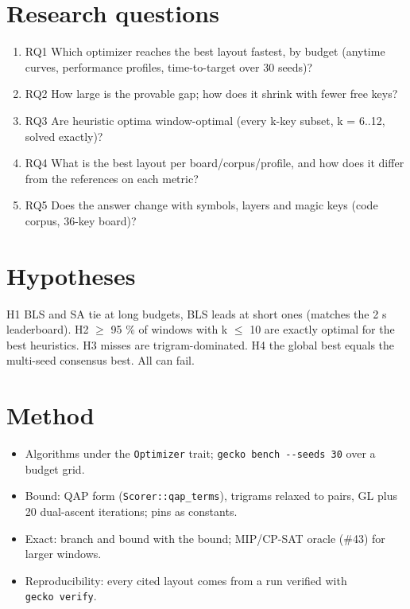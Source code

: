 \documentclass{gecko-paper}
\begin{document}
\begin{paperbody}
\section{Research questions}

\begin{enumerate}
\def\labelenumi{\arabic{enumi}.}
\setlength{\itemsep}{1pt}\setlength{\parskip}{0pt}
\item
  RQ1 Which optimizer reaches the best layout fastest, by budget
  (anytime curves, performance profiles, time-to-target over 30 seeds)?
\item
  RQ2 How large is the provable gap; how does it shrink with fewer free
  keys?
\item
  RQ3 Are heuristic optima window-optimal (every k-key subset, k =
  6..12, solved exactly)?
\item
  RQ4 What is the best layout per board/corpus/profile, and how does it
  differ from the references on each metric?
\item
  RQ5 Does the answer change with symbols, layers and magic keys (code
  corpus, 36-key board)?
\end{enumerate}

\section{Hypotheses}

H1 BLS and SA tie at long budgets, BLS leads at short ones (matches the
2 s leaderboard). H2 $\geq$ 95 \% of windows with k $\leq$ 10 are exactly optimal
for the best heuristics. H3 misses are trigram-dominated. H4 the global
best equals the multi-seed consensus best. All can fail.

\section{Method}

\begin{itemize}
\setlength{\itemsep}{1pt}\setlength{\parskip}{0pt}
\item
  Algorithms under the \texttt{Optimizer} trait;
  \texttt{gecko\ bench\ -\/-seeds\ 30} over a budget grid.
\item
  Bound: QAP form (\texttt{Scorer::qap\_terms}), trigrams relaxed to
  pairs, GL plus 20 dual-ascent iterations; pins as constants.
\item
  Exact: branch and bound with the bound; MIP/CP-SAT oracle (\#43) for
  larger windows.
\item
  Reproducibility: every cited layout comes from a run verified with
  \texttt{gecko\ verify}.
\end{itemize}


\end{paperbody}
\end{document}
